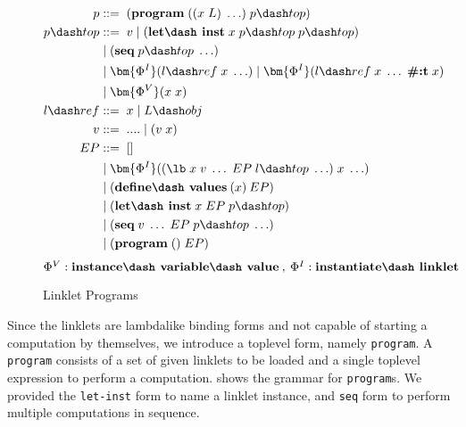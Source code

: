 \begin{wrapfigure}[22]{r}{0.5\textwidth}
  \footnotesize
  \vspace{-0.5cm}
  \begin{mdframed}
    \begin{align*}
      p           &::=\; (\textbf{program}\; ((x\; L)\; \ldots)\; p\dash top) \\
      p\dash top  &::=\; v\; |\; (\textbf{let\dash inst}\; x\; p\dash top\;p\dash top) \\
      \;          &\;|\; (\textbf{seq}\; p\dash top\; \ldots) \\
      \;          &\;|\; \bm{\Phi^I}(l\dash ref\; x\; \ldots)\; |\; \bm{\Phi^I}(l\dash ref\; x\; \ldots\; \textbf{\#:t}\; x) \\
      \;          &\;|\; \bm{\Phi^V}(x\; x) \\
      l\dash ref &::=\; x\; |\; L\dash obj \\
      v           &::=\; ....\;|\;(v\;x) \\
      EP          &::=\; [] \\
      \;          &\;|\; \bm{\Phi^I}((\lb\; x\; v\; \ldots\; EP\; l\dash top\; \ldots)\; x\; \ldots) \\
      \;          &\;|\; (\textbf{define\dash values}\:(x)\:EP) \\
      \;          &\;|\; (\textbf{let\dash inst}\; x\; EP\; p\dash top) \\
      \;          &\;|\; (\textbf{seq}\; v\; \ldots\; EP\; p\dash top\; \ldots) \\
      \;          &\;|\; (\textbf{program}\; ()\; EP) \\
    \end{align*}
    \hfill \footnotesize $\Phi^V : \textbf{instance\dash variable\dash value}\:,\: \Phi^I : \textbf{instantiate\dash linklet}$
    \caption{Linklet Programs}
    \label{fig:linklet-program}
  \end{mdframed}
\end{wrapfigure}

Since the linklets are lambda\dash like binding forms and not capable
of starting a computation by themselves, we introduce a top\dash level
form, namely \verb|program|. A \verb|program| consists of a set of
given linklets to be loaded and a single top\dash level expression to
perform a computation.  shows the
grammar for \verb|program|s. We provided the \verb|let-inst| form to
name a linklet instance, and \verb|seq| form to perform multiple
computations in sequence.

